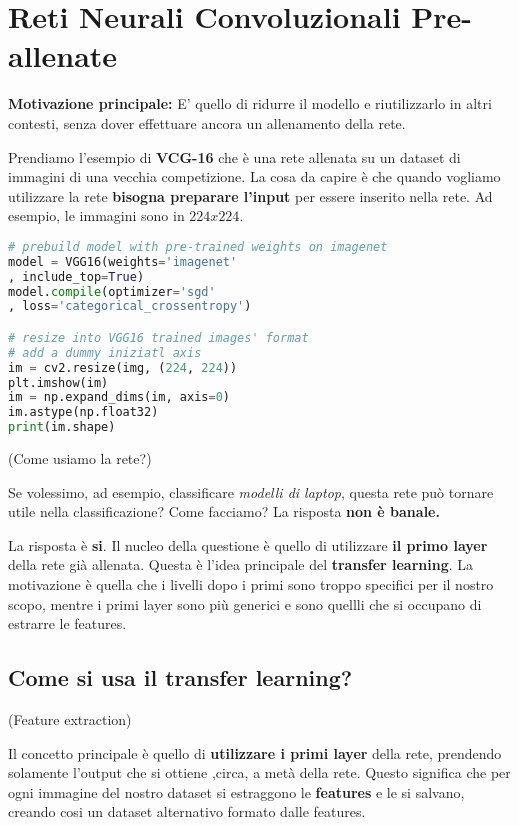 \section{Reti Neurali Convoluzionali Pre-allenate}

\textbf{Motivazione principale:} E' quello di ridurre il modello e riutilizzarlo in altri contesti, senza dover effettuare ancora un allenamento della rete.

Prendiamo l'esempio di \textbf{VCG-16} che è una rete allenata su un dataset di
immagini di una vecchia competizione. La cosa da capire è che quando vogliamo
utilizzare la rete \textbf{bisogna preparare l'input} per essere inserito nella
rete. Ad esempio, le immagini sono in $224x224$.

\begin{lstlisting}[language=Python]
# prebuild model with pre-trained weights on imagenet
model = VGG16(weights='imagenet'
, include_top=True)
model.compile(optimizer='sgd'
, loss='categorical_crossentropy')

# resize into VGG16 trained images' format
# add a dummy iniziatl axis
im = cv2.resize(img, (224, 224))
plt.imshow(im)
im = np.expand_dims(im, axis=0)
im.astype(np.float32)
print(im.shape)
\end{lstlisting}

\begin{domanda}(Come usiamo la rete?)
\end{domanda}

Se volessimo, ad esempio, classificare \textit{modelli di laptop}, questa rete
può tornare utile nella classificazione? Come facciamo? La risposta \textbf{non
    è banale.}

La risposta è \textbf{si}. Il nucleo della questione è quello di utilizzare
\textbf{il primo layer} della rete già allenata. Questa è l'idea principale del
\textbf{transfer learning}. La motivazione è quella che i livelli dopo i primi
sono troppo specifici per il nostro scopo, mentre i primi layer sono più
generici e sono quellli che si occupano di estrarre le features.

\subsection{Come si usa il transfer learning?}

\begin{definition}(Feature extraction)
\end{definition}
Il concetto principale è quello di \textbf{utilizzare i primi layer} della rete,
prendendo solamente l'output che si ottiene ,circa, a metà della rete. Questo
significa che per ogni immagine del nostro dataset si estraggono le
\textbf{features} e le si salvano, creando cosi un dataset alternativo formato
dalle features.

